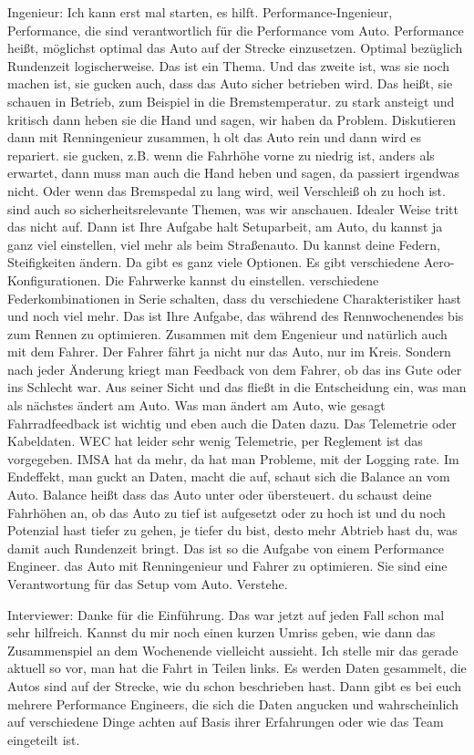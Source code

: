 Ingenieur: 
Ich kann erst mal starten, es hilft. Performance-Ingenieur, Performance, die sind verantwortlich für die Performance vom Auto. Performance heißt, möglichst optimal das Auto auf der Strecke einzusetzen. Optimal bezüglich Rundenzeit logischerweise.  Das ist ein Thema. Und das zweite ist, was sie noch machen ist, sie gucken auch, dass das Auto sicher betrieben wird. Das heißt, sie schauen in Betrieb, zum Beispiel in die Bremstemperatur.  zu stark ansteigt und kritisch  dann heben sie die Hand und sagen, wir haben da Problem. Diskutieren dann mit Renningenieur zusammen, h olt das Auto rein und dann wird es repariert.  sie gucken, z.B. wenn die Fahrhöhe vorne zu niedrig ist, anders als erwartet, dann muss man auch die Hand heben und sagen, da passiert irgendwas nicht. Oder wenn das Bremspedal zu lang wird, weil Verschleiß oh  zu hoch ist. sind auch so sicherheitsrelevante Themen, was wir anschauen.  Idealer Weise tritt das nicht auf. Dann ist Ihre Aufgabe halt Setuparbeit, am Auto, du kannst ja ganz viel einstellen, viel mehr als beim Straßenauto. Du kannst deine Federn, Steifigkeiten ändern. Da gibt es ganz viele Optionen. Es gibt verschiedene Aero-Konfigurationen. Die Fahrwerke kannst du einstellen.   verschiedene Federkombinationen in Serie schalten, dass du verschiedene Charakteristiker hast und noch viel mehr. Das ist Ihre Aufgabe, das während des Rennwochenendes bis zum Rennen zu optimieren.   Zusammen mit dem Engenieur und natürlich auch mit dem Fahrer. Der Fahrer fährt ja nicht nur das Auto, nur im Kreis. Sondern nach jeder Änderung kriegt man Feedback von dem Fahrer, ob das ins Gute oder ins Schlecht war. Aus seiner Sicht und das fließt in die Entscheidung ein, was man als nächstes ändert am Auto.   Was man ändert am Auto, wie gesagt Fahrradfeedback ist wichtig und eben auch die Daten dazu.  Das Telemetrie oder Kabeldaten. WEC hat leider sehr wenig Telemetrie, per Reglement ist das vorgegeben. IMSA hat da mehr, da hat man Probleme, mit der Logging rate. Im Endeffekt, man guckt an Daten, macht die auf, schaut sich die Balance an vom Auto.  Balance heißt dass das Auto unter oder übersteuert. du schaust deine Fahrhöhen an, ob das Auto zu tief ist aufgesetzt oder zu hoch ist und du noch Potenzial hast tiefer zu gehen, je tiefer du bist, desto mehr Abtrieb hast du, was damit auch Rundenzeit bringt. Das ist so die Aufgabe von einem Performance Engineer. das Auto mit Renningenieur und Fahrer zu optimieren. Sie sind eine Verantwortung für das Setup vom Auto. Verstehe. 

Interviewer: 
Danke für die Einführung. Das war jetzt auf jeden Fall schon mal sehr hilfreich.  Kannst du mir noch einen kurzen Umriss geben, wie dann das Zusammenspiel an dem Wochenende vielleicht aussieht.  Ich stelle mir das gerade aktuell so vor, man hat die Fahrt in Teilen links.  Es werden Daten gesammelt, die Autos sind auf der Strecke, wie du schon beschrieben hast. Dann gibt es bei euch mehrere Performance Engineers, die sich die Daten angucken und wahrscheinlich auf verschiedene Dinge  achten auf Basis ihrer Erfahrungen oder wie das Team eingeteilt ist.   

